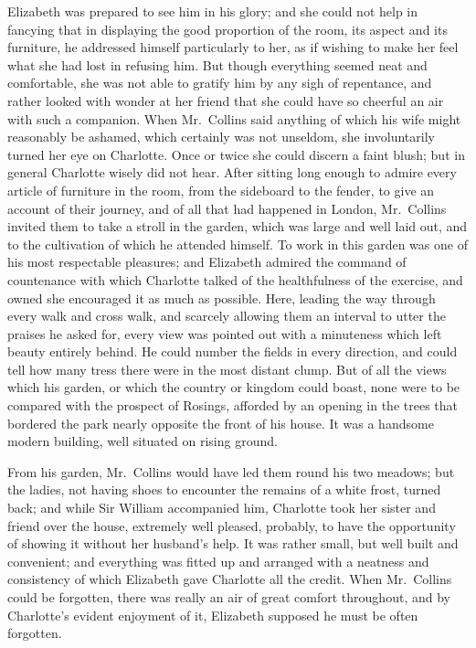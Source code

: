 \documentclass[12pt,english,oneside]{book}
\begin{document}
Elizabeth was prepared to see him in his glory; and she could not
help in fancying that in displaying the good proportion of the room,
its aspect and its furniture, he addressed himself particularly to
her, as if wishing to make her feel what she had lost in refusing
him. But though everything seemed neat and comfortable, she was not
able to gratify him by any sigh of repentance, and rather looked with
wonder at her friend that she could have so cheerful an air with such
a companion. When Mr.\ Collins said anything of which his wife might
reasonably be ashamed, which certainly was not unseldom, she involuntarily
turned her eye on Charlotte. Once or twice she could discern a faint
blush; but in general Charlotte wisely did not hear. After sitting
long enough to admire every article of furniture in the room, from
the sideboard to the fender, to give an account of their journey,
and of all that had happened in London, Mr.\ Collins invited them
to take a stroll in the garden, which was large and well laid out,
and to the cultivation of which he attended himself. To work in this
garden was one of his most respectable pleasures; and Elizabeth admired
the command of countenance with which Charlotte talked of the healthfulness
of the exercise, and owned she encouraged it as much as possible.
Here, leading the way through every walk and cross walk, and scarcely
allowing them an interval to utter the praises he asked for, every
view was pointed out with a minuteness which left beauty entirely
behind. He could number the fields in every direction, and could tell
how many tress there were in the most distant clump. But of all the
views which his garden, or which the country or kingdom could boast,
none were to be compared with the prospect of Rosings, afforded by
an opening in the trees that bordered the park nearly opposite the
front of his house. It was a handsome modern building, well situated
on rising ground.

From his garden, Mr.\ Collins would have led them round his two meadows;
but the ladies, not having shoes to encounter the remains of a white
frost, turned back; and while Sir William accompanied him, Charlotte
took her sister and friend over the house, extremely well pleased,
probably, to have the opportunity of showing it without her husband's
help. It was rather small, but well built and convenient; and everything
was fitted up and arranged with a neatness and consistency of which
Elizabeth gave Charlotte all the credit. When Mr.\ Collins could
be forgotten, there was really an air of great comfort throughout,
and by Charlotte's evident enjoyment of it, Elizabeth supposed he
must be often forgotten.
\end{document}
